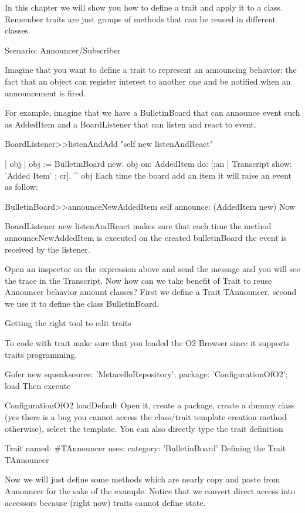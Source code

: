 

In this chapter we will show you how to define a trait and apply it to a class. Remember traits are just groups of methods that can be reused in different classes.

Scenario: Announcer/Subscriber

Imagine that you want to define a trait to represent an announcing behavior: the fact that an object can register interest to another one and be notified when an announcement is fired.

For example, imagine that we have a BulletinBoard that can announce event such as AddedItem and a BoardListener that can listen and react to event.

BoardListener>>listenAndAdd
	"self new listenAndReact"
	
	| obj |
	obj := BulletinBoard new.
	obj on: AddedItem do: [:an | Transcript show: 'Added Item' ; cr].
	^ obj
Each time the board add an item it will raise an event as follow:

BulletinBoard>>announceNewAddedItem
	self announce: (AddedItem new)
Now

BoardListener new listenAndReact
makes sure that each time the method announceNewAddedItem is executed on the created bulletinBoard the event is received by the listener.

Open an inspector on the expression above and send the message and you will see the trace in the Transcript. Now how can we take benefit of Trait to reuse Announcer behavior amount classes? First we define a Trait TAnnouncer, second we use it to define the class BulletinBoard.

Getting the right tool to edit traits

To code with trait make sure that you loaded the O2 Browser since it supports traits programming.

	Gofer new
		squeaksource: 'MetacelloRepository';
		package: 'ConfigurationOfO2';
		load
Then execute

	ConfigurationOfO2 loadDefault
Open it, create a package, create a dummy class (yes there is a bug you cannot access the class/trait template creation method otherwise), select the template. You can also directly type the trait definition

Trait named: #TAnnouncer
	uses: {}
	category: 'BulletinBoard'
Defining the Trait TAnnouncer

Now we will just define some methods which are nearly copy and paste from Announcer for the sake of the example. Notice that we convert direct access into accessors because (right now) traits cannot define state.

